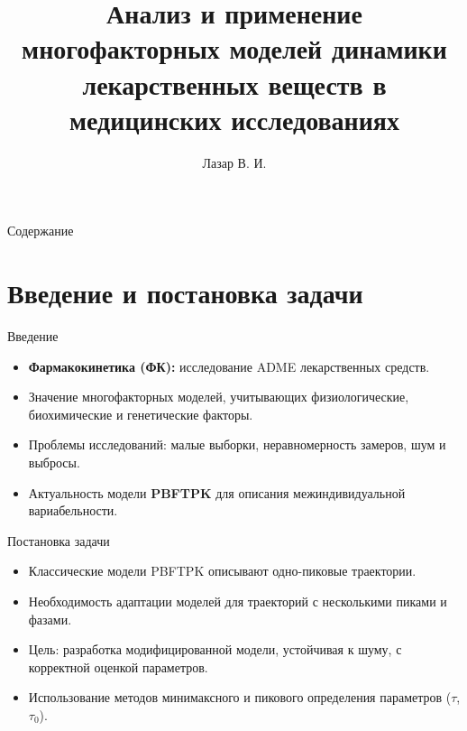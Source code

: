 \documentclass{beamer}
\title{Анализ и применение многофакторных моделей динамики лекарственных веществ в медицинских исследованиях}
\author{Лазар В. И.}
\institute{кафедра МС ВМК МГУ}
\begin{document}
\begin{frame}
	\titlepage
\end{frame}

\begin{frame}{Содержание}
	\tableofcontents
\end{frame}

\section{Введение и постановка задачи}
\begin{frame}{Введение}
	\begin{itemize}
		\item \textbf{Фармакокинетика (ФК):} исследование ADME лекарственных средств.
		\item Значение многофакторных моделей, учитывающих физиологические, биохимические и генетические факторы.
		\item Проблемы исследований: малые выборки, неравномерность замеров, шум и выбросы.
		\item Актуальность модели \textbf{PBFTPK} для описания межиндивидуальной вариабельности.
	\end{itemize}
\end{frame}

\begin{frame}{Постановка задачи}
	\begin{itemize}
		\item Классические модели PBFTPK описывают одно-пиковые траектории.
		\item Необходимость адаптации моделей для траекторий с несколькими пиками и фазами.
		\item Цель: разработка модифицированной модели, устойчивая к шуму, с корректной оценкой параметров.
		\item Использование методов минимаксного и пикового определения параметров ($\tau$, $\tau_0$).
	\end{itemize}
\end{frame}

\end{document}
